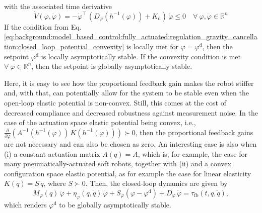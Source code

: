 with the associated time derivative~\citep{della2023model}
\begin{equation}
    \dot{V}(\varphi,\dot{\varphi}) = -\dot{\varphi}^\top \, \left ( D_\varphi(h^{-1}(\varphi)) + K_\mathrm{d} \right ) \, \dot{\varphi} \leq 0 \quad \forall \: \varphi,\dot{\varphi} \in \mathbb{R}^n
\end{equation}
If the condition from Eq.\ref{eq:background:model_based_control:fully_actuated:regulation_gravity_cancellation:closed_loop_potential_convexity} is locally met for $\varphi = \varphi^\mathrm{d}$, then the setpoint $\varphi^\mathrm{d}$ is locally asymptotically stable. If the convexity condition is met $\forall \: \varphi \in \mathbb{R}^n$, then the setpoint is globally asymptotically stable.


Here, it is easy to see how the proportional feedback gain makes the robot stiffer and, with that, can potentially allow for the system to be stable even when the open-loop elastic potential is non-convex. Still, this comes at the cost of decreased compliance and decreased robustness against measurement noise.
In the case of the actuation space elastic potential being convex, i.e., $\frac{\partial}{\partial \varphi} \left (A^{-1}(h^{-1}(\varphi)) \,  K(h^{-1}(\varphi)) \right ) \succ 0$, then the proportional feedback gains are not necessary and can also be chosen as zero.
An interesting case is also when (i) a constant actuation matrix $A(q) = A$, which is, for example, the case for many pneumatically-actuated soft robots, together with (ii) and a convex configuration space elastic potential, as for example the case for linear elasticity $K(q) = S \, q$, where $S\succ 0$. Then, the closed-loop dynamics are given by
\begin{equation}
    M_\varphi(q) \, \ddot{\varphi} +  \eta_\varphi(q,\dot{q}) \, \dot{\varphi} + S_\varphi ( \varphi - \varphi^\mathrm{d} ) + D_\varphi \, \dot{\varphi} = \tau_\mathrm{fb}(t, q, \dot{q}),
\end{equation}
which renders $\varphi^\mathrm{d}$ to be globally asymptotically stable.


